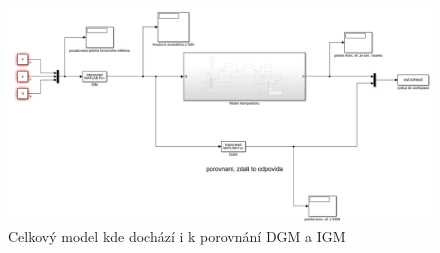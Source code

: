 \documentclass{article}
\begin{document}
			\begin{figure}[H]
				\centering
				\includegraphics[width=\textwidth]{./Graphics/2_Graphics/model_2.PNG}
				\caption{Celkový model kde dochází i k porovnání DGM a IGM}
				\label{pic:2_model_2}
			\end{figure}
\end{document}
